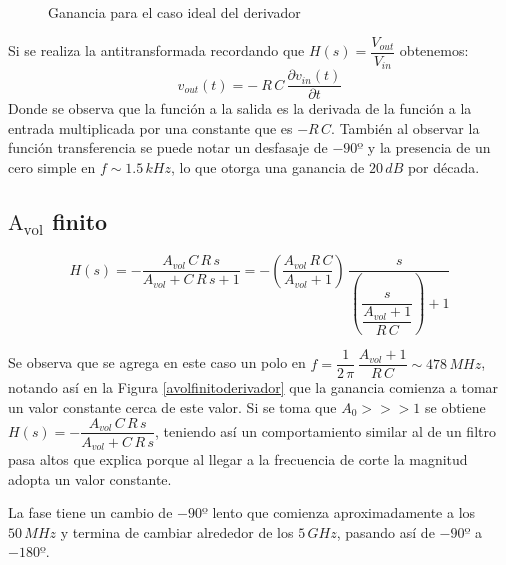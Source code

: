 \begin{center}
	\begin{figure}[H]	
	\caption{Ganancia para el caso ideal del derivador}
	\label{fig:avolidealderivador}
	\end{figure}
\end{center}

Si se realiza la antitransformada recordando que $H(s)= \dfrac{V_{out}}{V_{in}}$ obtenemos:
\begin{equation} 
v_{out} (t) = - \ R \,C \, \dfrac{\partial v_{in}(t)}{\partial t}
\end{equation}
Donde se observa que la función a la salida es la derivada de la función a la entrada multiplicada por una constante que es $- R\,C$. También al observar la función transferencia se puede notar un desfasaje de $-90º$ y la presencia de un cero simple en $f \sim 1.5 \,kHz$, lo que otorga una ganancia de $20 \, dB$ por década.

\subsection{$\mathrm{A_{vol}}$ finito}
\begin{equation}
H(s) = - \dfrac{A_{vol} \,C\,R\,s}{A_{vol} + C \,R \,s +1 } 
= -
\left( \dfrac{A_{vol} \,R \,C}{A_{vol} + 1} \right) \, \dfrac{s}{ \left( \dfrac{s}{\dfrac {A_{vol} +1}{R \,C}} \right) + 1}
\end{equation}

Se observa que se agrega en este caso un polo en $f = \dfrac{1}{2 \,\pi} \, \dfrac {A_{vol} +1}{R \,C} \sim 478 \, MHz $, notando así en la Figura \ref{avolfinitoderivador} que la ganancia comienza a tomar un valor constante  cerca de este valor. Si se toma que $A_0 >>> 1$ se obtiene $H(s)=- \dfrac{A_{vol} \,C\,R\,s}{A_{vol} + C \,R \,s}$, teniendo así un comportamiento similar al de un filtro pasa altos que explica porque al llegar a la frecuencia de corte la magnitud adopta un valor constante.

La fase tiene un cambio de $-90º$ lento que comienza aproximadamente a los $50 \, MHz$ y termina de cambiar alrededor de los $5 \,GHz$, pasando así de $-90º$ a $-180º$.

